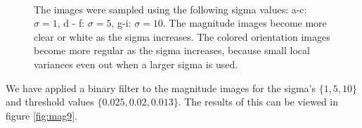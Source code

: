 \documentclass[a4paper]{article}
\begin{document}
\begin{figure}[H]
{   }
      \\
  \caption{The images were sampled using the following sigma values: a-c: $\sigma  = 1$, d - f: $\sigma = 5$, g-i: $\sigma=10$. The magnitude images become more clear or white as the sigma increases. The colored orientation images become more regular as the sigma increases, because small local variances even out when a larger sigma is used.}
     \label{magOr}
\end{figure}

\noindent
We have applied a binary filter to the magnitude images for the sigma's $\{1,5,10\}$ and threshold values $\{0.025, 0.02, 0.013\}$. The results of this can be viewed in figure \ref{fig:mag9}.
\end{document}
